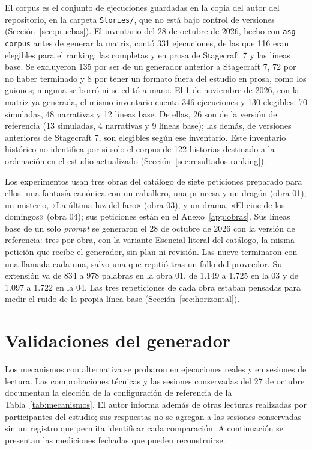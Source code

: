 El corpus es el conjunto de ejecuciones guardadas en la copia del autor del repositorio, en la
carpeta \texttt{Stories/}, que no está bajo control de versiones (Sección~\ref{sec:pruebas}). El
inventario del 28
de octubre de 2026, hecho con \texttt{asg-corpus} antes de generar la matriz, contó 331 ejecuciones,
de las que 116 eran elegibles para el ranking: las completas y en prosa de Stagecraft 7 y las líneas
base. Se excluyeron 135 por ser de un generador anterior a Stagecraft 7, 72 por no haber terminado y
8 por tener un formato fuera del estudio en prosa, como los guiones; ninguna se borró ni se editó a
mano. El 1 de noviembre de 2026, con la matriz ya generada, el mismo inventario cuenta 346
ejecuciones y 130 elegibles: 70 simuladas, 48 narrativas y 12 líneas base. De ellas, 26 son de la
versión de referencia (13 simuladas, 4 narrativas y 9 líneas base); las demás, de versiones anteriores de
Stagecraft 7, son elegibles según ese inventario. Este inventario histórico no identifica por sí
solo el corpus de 122 historias destinado a la ordenación en el estudio actualizado
(Sección~\ref{sec:resultados-ranking}).

Los experimentos usan tres obras del catálogo de siete peticiones preparado para ellos: una fantasía
canónica con un caballero, una princesa y un dragón (obra 01), un misterio, «La última luz del faro»
(obra 03), y un drama, «El cine de los domingos» (obra 04); sus peticiones están en el
Anexo~\ref{app:obras}. Sus líneas base de un solo
\textit{prompt} se generaron el 28 de octubre de 2026 con la versión de referencia: tres por obra, con la
variante Esencial literal del catálogo, la misma petición que recibe el generador, sin plan ni
revisión. Las nueve terminaron con una llamada cada una, salvo una que repitió tras un fallo del
proveedor. Su extensión va de 834 a 978 palabras en la obra 01, de 1.149 a 1.725 en la 03 y de 1.097
a 1.722 en la 04. Las tres repeticiones de cada obra estaban pensadas para medir el ruido de la
propia línea base (Sección~\ref{sec:horizontal}).

\section{Validaciones del generador}\label{sec:validaciones}

Los mecanismos con alternativa se probaron en ejecuciones reales y en sesiones de lectura.
Las comprobaciones técnicas y las sesiones conservadas del 27 de octubre documentan la elección de
la configuración de referencia de la Tabla~\ref{tab:mecanismos}. El autor informa además de otras
lecturas realizadas por participantes del estudio; sus respuestas no se agregan a las sesiones
conservadas sin un registro que permita identificar cada comparación. A continuación se presentan
las mediciones fechadas que pueden reconstruirse.

